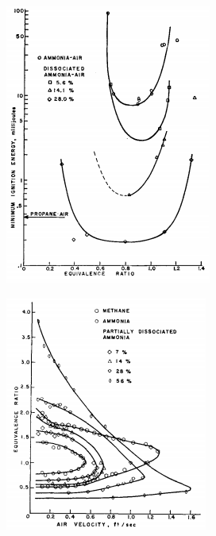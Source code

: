   \begin{figure} [h]
\centering
\begin{subfigure}{.5\textwidth}
  \centering
  \includegraphics[width=0.9\linewidth]{./pictures/ignitionenergyNH3.png}
  \label{fig:mixproperties1}
\end{subfigure}%
\begin{subfigure}{.5\textwidth}
  \centering
  \includegraphics[width=0.9\linewidth]{./pictures/flamestabilityNH3.png}

\end{subfigure}
\end{figure}
